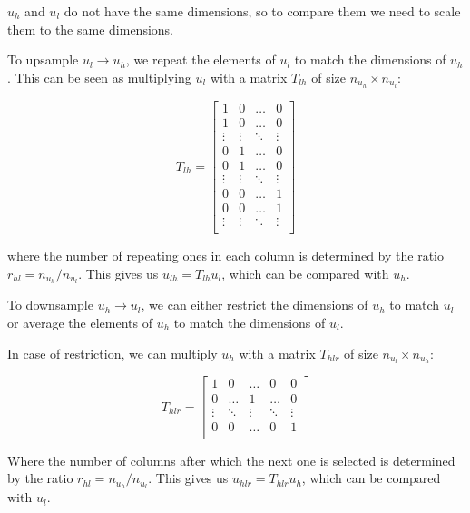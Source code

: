 \documentclass{article}
\begin{document}
$u_h$ and $u_l$ do not have the same dimensions, so to compare them we need to scale them to the same dimensions.

To upsample $u_l \rightarrow u_h$, we repeat the elements of $u_l$ to match the dimensions of $u_h$.
This can be seen as multiplying $u_l$ with a matrix $T_{lh}$ of size $n_{u_h} \times n_{u_l}$:

\begin{equation}
  T_{lh} =
  \begin{bmatrix}
    1 & 0 & \ldots & 0 \\
    1 & 0 & \ldots & 0 \\
    \vdots & \vdots & \ddots & \vdots \\
    0 & 1 & \ldots & 0 \\
    0 & 1 & \ldots & 0 \\
    \vdots & \vdots & \ddots & \vdots \\
    0 & 0 & \ldots & 1 \\
    0 & 0 & \ldots & 1 \\
    \vdots & \vdots & \ddots & \vdots \\
  \end{bmatrix}
\end{equation}

where the number of repeating ones in each column is determined by the ratio $r_{hl} = n_{u_h} / n_{u_l}$.
This gives us $u_{lh} = T_{lh} u_l$, which can be compared with $u_h$.

To downsample $u_h \rightarrow u_l$, we can either restrict the dimensions of $u_h$ to match $u_l$ or average the elements of $u_h$ to match the dimensions of $u_l$.

In case of restriction, we can multiply $u_h$ with a matrix $T_{hlr}$ of size $n_{u_l} \times n_{u_h}$:

\begin{equation}
  T_{hlr} =
  \begin{bmatrix}
    1 & 0 & \ldots & 0 & 0 \\
    0 & \ldots & 1 & \ldots & 0 \\
    \vdots & \ddots & \vdots & \ddots & \vdots \\
    0 & 0 & \ldots & 0 & 1 \\
  \end{bmatrix}
\end{equation}

Where the number of columns after which the next one is selected is determined by the ratio $r_{hl} = n_{u_h} / n_{u_l}$.
This gives us $u_{hlr} = T_{hlr} u_h$, which can be compared with $u_l$.
\end{document}
